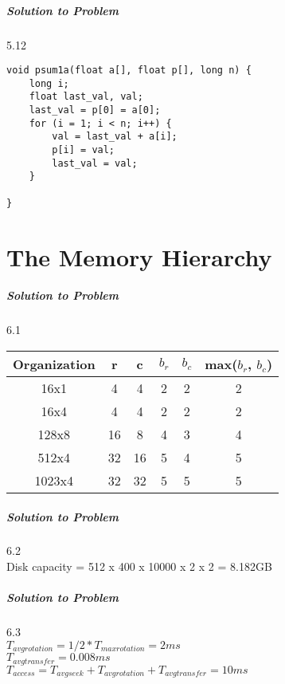 \documentclass{report}
\begin{document}
\paragraph{Solution to Problem } 5.12\\
\begin{lstlisting}
void psum1a(float a[], float p[], long n) {
    long i;
    float last_val, val;
    last_val = p[0] = a[0];
    for (i = 1; i < n; i++) {
        val = last_val + a[i];
        p[i] = val;
        last_val = val;
    }

}
\end{lstlisting}

\chapter{The Memory Hierarchy}
\paragraph{Solution to Problem } 6.1\\
\begin{center}
\begin{tabular}{ |c|c|c|c|c|c| } 
\hline
Organization & r & c & $b_r$ & $b_c$ & max($b_r$, $b_c$) \\
\hline
16x1 & 4 & 4 & 2 & 2 & 2 \\
16x4 & 4 & 4 & 2 & 2 & 2 \\
128x8 & 16 & 8 & 4 & 3 & 4 \\
512x4 & 32 & 16 & 5 & 4 & 5 \\
1023x4 & 32 & 32 & 5 & 5 & 5 \\
\hline
\end{tabular}
\end{center}


\paragraph{Solution to Problem } 6.2\\
Disk capacity = 512 x 400 x 10000 x 2 x 2 = 8.182GB
\paragraph{Solution to Problem } 6.3\\
$T_{avg rotation} = 1/2 * T_{max rotation} = 2ms$ \\
$T_{avg transfer} = 0.008ms$ \\
$T_{access} = T_{avg seek} + T_{avg rotation} + T_{avg transfer} = 10ms$ 
\end{document}
